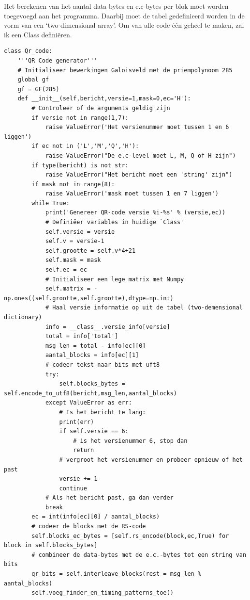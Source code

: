 \documentclass[a4paper]{article}
\begin{document}
Het berekenen van het aantal data-bytes en e.c-bytes per blok moet worden toegevoegd aan het programma. Daarbij moet de tabel gedefinieerd worden in de vorm van een `two-dimensional array'. Om van alle code één geheel te maken, zal ik een Class definiëren.
\begin{verbatim}
class Qr_code:
    '''QR Code generator'''
    # Initialiseer bewerkingen Galoisveld met de priempolynoom 285
    global gf
    gf = GF(285)
    def __init__(self,bericht,versie=1,mask=0,ec='H'):
        # Controleer of de arguments geldig zijn
        if versie not in range(1,7):
            raise ValueError('Het versienummer moet tussen 1 en 6 liggen')
        if ec not in ('L','M','Q','H'):
            raise ValueError("De e.c-level moet L, M, Q of H zijn")
        if type(bericht) is not str:
            raise ValueError("Het bericht moet een 'string' zijn")
        if mask not in range(8):
            raise ValueError('mask moet tussen 1 en 7 liggen')
        while True:
            print('Genereer QR-code versie %i-%s' % (versie,ec))
            # Definiëer variables in huidige `Class'
            self.versie = versie
            self.v = versie-1
            self.grootte = self.v*4+21
            self.mask = mask
            self.ec = ec
            # Initialiseer een lege matrix met Numpy
            self.matrix = -np.ones((self.grootte,self.grootte),dtype=np.int)
            # Haal versie informatie op uit de tabel (two-demensional dictionary)
            info = __class__.versie_info[versie]
            total = info['total']
            msg_len = total - info[ec][0]
            aantal_blocks = info[ec][1]
            # codeer tekst naar bits met uft8
            try:
                self.blocks_bytes = self.encode_to_utf8(bericht,msg_len,aantal_blocks)
            except ValueError as err:
                # Is het bericht te lang:
                print(err)
                if self.versie == 6:
                    # is het versienummer 6, stop dan
                    return
                # vergroot het versienummer en probeer opnieuw of het past
                versie += 1
                continue
            # Als het bericht past, ga dan verder
            break
        ec = int(info[ec][0] / aantal_blocks)
        # codeer de blocks met de RS-code
        self.blocks_ec_bytes = [self.rs_encode(block,ec,True) for block in self.blocks_bytes]
        # combineer de data-bytes met de e.c.-bytes tot een string van bits
        qr_bits = self.interleave_blocks(rest = msg_len % aantal_blocks)
        self.voeg_finder_en_timing_patterns_toe()

\end{verbatim}
\end{document}
